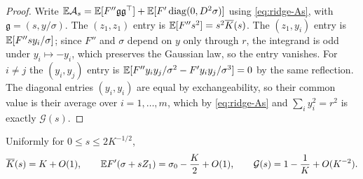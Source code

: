 \begin{proof}
Write $\mathbb{E}\mathcal A_s=\mathbb{E}[F''\mathfrak g\mathfrak g^\top]+\mathbb{E}[F'\operatorname{diag}(0,D^2\sigma)]$ using
\eqref{eq:ridge-As}, with $\mathfrak g=(s,y/\sigma)$. The $(z_1,z_1)$ entry is
$\mathbb{E}[F''s^2]=s^2\overline K(s)$. The $(z_1,y_i)$ entry is $\mathbb{E}[F''sy_i/\sigma]$; since $F''$ and
$\sigma$ depend on $y$ only through $r$, the integrand is odd under $y_i\mapsto-y_i$, which
preserves the Gaussian law, so the entry vanishes. For $i\neq j$ the $(y_i,y_j)$ entry is
$\mathbb{E}[F''y_iy_j/\sigma^2-F'y_iy_j/\sigma^3]=0$ by the same reflection. The diagonal entries
$(y_i,y_i)$ are equal by exchangeability, so their common value is their average over
$i=1,\dots,m$, which by \eqref{eq:ridge-As} and $\sum_iy_i^2=r^2$ is exactly $\mathcal G(s)$.
\end{proof}

\begin{lemma}
\label{lem:ridge-profile}
Uniformly for $0\leq s\leq2K^{-1/2}$,
\begin{equation}
\label{eq:ridge-profile-est}
    \overline K(s)=K+O(1),
    \qquad
    \mathbb{E} F'(\sigma+sZ_1)=\sigma_0-\frac K2+O(1),
    \qquad
    \mathcal G(s)=1-\frac1K+O(K^{-2}).
\end{equation}
\end{lemma}

